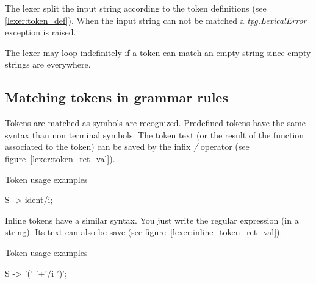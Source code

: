 The lexer split the input string according to the token definitions (see \ref{lexer:token_def}). When the input string can not be matched a \emph{tpg.LexicalError} exception is raised.

The lexer may loop indefinitely if a token can match an empty string since empty strings are everywhere.

\subsection{Matching tokens in grammar rules}

Tokens are matched as symbols are recognized.
Predefined tokens have the same syntax than non terminal symbols.
The token text (or the result of the function associated to the token) can be saved by the infix \emph{/} operator (see figure~\ref{lexer:token_ret_val}).

\begin{code}
\caption{Token usage examples}								\label{lexer:token_ret_val}
\begin{verbatimtab}[4]
	S -> ident/i;
\end{verbatimtab}
\end{code}

Inline tokens have a similar syntax. You just write the regular expression (in a string). Its text can also be save (see figure~\ref{lexer:inline_token_ret_val}).

\begin{code}
\caption{Token usage examples}								\label{lexer:inline_token_ret_val}
\begin{verbatimtab}[4]
	S -> '(' '\w+'/i ')';
\end{verbatimtab}
\end{code}
